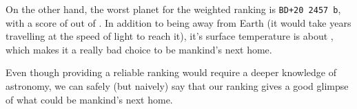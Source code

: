 \documentclass[12p]{article}
\begin{document}
On the other hand, the worst planet for the weighted ranking is \verb|BD+20 2457 b|, with a score of  out of . In addition to being  away from Earth (it would take  years travelling at the speed of light to reach it), it's surface temperature is about , which makes it a really bad choice to be mankind's next home.

Even though providing a reliable ranking would require a deeper knowledge of astronomy, we can safely (but naively) say that our ranking gives a good glimpse of what could be mankind's next home.


\printbibliography

\appendix
\begin{landscape}

\end{landscape}
\end{document}
